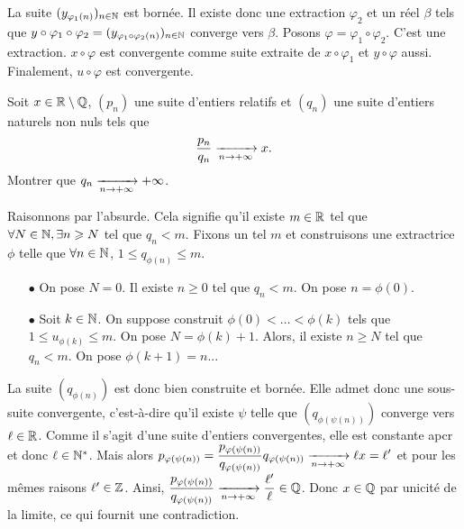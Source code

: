 \documentclass{magnolia}
\begin{document}
\begin{preuve}
\begin{itemize}
La suite $(y_{\varphi_1(n)})_{n\in\mathbb{N}}$ est bornée. Il existe donc une extraction $\varphi_2$ et un réel $\beta$ tels que $y\circ \varphi_1 \circ \varphi_2=(y_{\varphi_1\circ\varphi_2(n)})_{n\in\mathbb{N}}$ converge vers $\beta$.
Posons $\varphi=\varphi_1\circ\varphi_2$. C'est une extraction. $x\circ\varphi$ est convergente comme suite extraite de $x\circ\varphi_1$ et $y\circ\varphi$ aussi.\\

Finalement, $u\circ \varphi$ est convergente.
\end{itemize}
\end{preuve}

\begin{exoUnique}
\exo Soit $x\in\mathbb{R}\setminus\mathbb{Q}$, $(p_n)$ une suite d'entiers relatifs et
  $(q_n)$ une suite d'entiers naturels non nuls tels que
  \[\frac{p_n}{q_n}\xrightarrow[n\rightarrow +\infty]{} x.\]
  Montrer que $q_n\xrightarrow[n\rightarrow +\infty]{}+\infty$.
\end{exoUnique}
\begin{sol}
Raisonnons par l'absurde. Cela signifie qu'il existe $m\in \mathbb{R}$ tel que $\forall N \in \mathbb{N}, \exists n\geqslant N$ tel que $q_n < m$.
Fixons un tel $m$ et construisons une extractrice $\phi$ telle que $\forall n \in \mathbb{N}$, $1\leq q_{\phi(n)}\leq m$.
\begin{itemize}
\item[$\bullet$] On pose $N=0$. Il existe $n\geq 0$ tel que $q_n<m$. On pose $n=\phi(0)$.
\item[$\bullet$] Soit $k\in \mathbb{N}$. On suppose construit $\phi(0)< \ldots< \phi(k)$ tels que $1\leq u_{\phi(k)}\leq m$.
On pose $N=\phi(k)+1$. Alors, il existe $n\geq N$ tel que $q_n<m$. On pose $\phi(k+1)=n$...
\end{itemize}
La suite $(q_{\phi(n)})$ est donc bien construite et bornée. Elle admet donc une sous-suite convergente, c'est-à-dire qu'il existe $\psi$ telle que $(q_{\phi(\psi(n))})$ converge vers $\ell \in \mathbb{R}$. Comme il s'agit d'une suite d'entiers convergentes, elle est constante apcr et donc $\ell \in {\mathbb{N}^*}$. Mais alors $\displaystyle p_{\varphi(\psi(n))}=\frac{p_{\varphi(\psi(n))}}{q_{\varphi(\psi(n))}}q_{\varphi(\psi(n))} \xrightarrow[n\rightarrow +\infty]{}{\ell x}=\ell'$ et pour les mêmes raisons $\ell' \in \mathbb{Z}$.
Ainsi, $\displaystyle \frac{p_{\varphi(\psi(n))}}{q_{\varphi(\psi(n))}} \xrightarrow[n\rightarrow +\infty]{} \frac{\ell'}{\ell} \in \mathbb{Q}$. Donc $x\in \mathbb{Q}$ par unicité de la limite, ce qui fournit une contradiction.
\end{sol}
\end{document}
